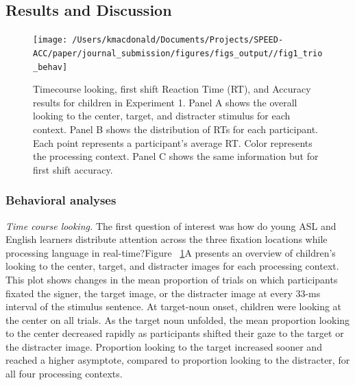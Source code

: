 \documentclass[english,floatsintext,man]{apa6}
\begin{document}
\hypertarget{results-and-discussion}{%
\subsection{Results and Discussion}\label{results-and-discussion}}

\begin{figure}[!t]

{\centering \texttt{[image: /Users/kmacdonald/Documents/Projects/SPEED-ACC/paper/journal\_submission/figures/figs\_output//fig1\_trio\_behav]} 

}

\caption{Timecourse looking, first shift Reaction Time (RT), and Accuracy results for children in Experiment 1. Panel A shows the overall looking to the center, target, and distracter stimulus for each context. Panel B shows the distribution of RTs for each participant. Each point represents a participant's average RT. Color represents the processing context. Panel C shows the same information but for first shift accuracy.}\label{fig:speed-acc-trio-plot}
\end{figure}

\hypertarget{behavioral-analyses}{%
\subsubsection{Behavioral analyses}\label{behavioral-analyses}}

\emph{Time course looking.} The first question of interest was how do
young ASL and English learners distribute attention across the three
fixation locations while processing language in real-time?Figure
~\ref{fig:speed-acc-trio-plot}A presents an overview of children's
looking to the center, target, and distracter images for each processing
context. This plot shows changes in the mean proportion of trials on
which participants fixated the signer, the target image, or the
distracter image at every 33-ms interval of the stimulus sentence. At
target-noun onset, children were looking at the center on all trials. As
the target noun unfolded, the mean proportion looking to the center
decreased rapidly as participants shifted their gaze to the target or
the distracter image. Proportion looking to the target increased sooner
and reached a higher asymptote, compared to proportion looking to the
distracter, for all four processing contexts.
\end{document}

